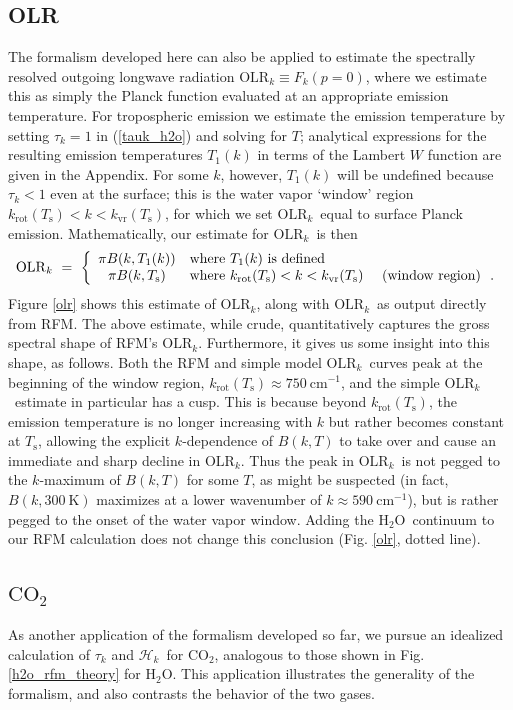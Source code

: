 \documentclass{ametsoc}
\newcommand{\beqn}{\begin{equation}}
\newcommand{\eeqn}{\end{equation}}
\newcommand{\eqnref}[1]{(\ref{#1})}
\newcommand{\Kelvin}{\ensuremath{\mathrm{K}}}
\newcommand{\cminverse}{\ensuremath{\mathrm{cm^{-1}}}}
\newcommand{\Ts}{\ensuremath{T_\mathrm{s}}}
\newcommand{\cotwo}{\ensuremath{\mathrm{CO_2}}}
\newcommand{\htwo}{\ensuremath{\mathrm{H_2O}}}
\newcommand{\OLRk}{\ensuremath{\mathrm{OLR}_k}}
\newcommand{\ch}{\ensuremath{\mathcal{H}}}
\newcommand{\chk}{\ensuremath{\ch_k}}
\newcommand{\tauk}{\ensuremath{\tau_k}}
\newcommand{\krot}{\ensuremath{k_\mathrm{rot}}}
\newcommand{\kvr}{\ensuremath{k_\mathrm{vr}}}
\begin{document}
\subsection{OLR} \label{sec_olrk}
The formalism developed here can also be applied to estimate the spectrally resolved outgoing longwave radiation $\OLRk \equiv F_k(p=0)$, where we estimate this as simply the Planck function evaluated at an appropriate emission temperature. For tropospheric emission we estimate the emission temperature by setting $\tauk=1$ in  \eqnref{tauk_h2o} and solving for $T$; analytical expressions for the resulting emission temperatures $T_1(k)$ in terms of the Lambert $W$ function are given in the Appendix. For some $k$, however,  $T_1(k)$ will be undefined because $\tauk<1$ even at the surface; this is the water vapor `window' region $\krot(\Ts) < k < \kvr(\Ts)$, for which we set \OLRk\ equal to surface Planck emission.  Mathematically, our estimate for  \OLRk\ is then 
\beqn
	\OLRk \ =  \ \left\{ \begin{array}{cl} \pi B(k,T_1(k)) & \mbox{where $T_1(k)$ is defined} \\
														\pi B(k,\Ts) & \mbox{where $\krot(\Ts) < k < \kvr(\Ts)$ \quad (window region) \ .} 
								\end{array}						
					   \right .
	\label{eqn_olrk}
\eeqn
Figure \ref{olr} shows this estimate of \OLRk, along with \OLRk\ as output directly from RFM. The above estimate, while crude, quantitatively captures the gross spectral shape of RFM's \OLRk. Furthermore, it gives us some insight into this shape, as follows. Both the RFM and simple model \OLRk\ curves peak at the beginning of the window region, $\krot(\Ts) \approx 750\ \cminverse$, and the simple  \OLRk\ estimate in particular has a cusp. This is because beyond $\krot(\Ts)$,   the emission temperature is no longer increasing with $k$ but rather becomes constant at \Ts,  allowing the explicit $k$-dependence of $B(k,T)$ to take over and cause an immediate and sharp decline in \OLRk. Thus the peak in \OLRk\ is not pegged to the $k$-maximum of $B(k,T)$ for some $T$, as might be suspected (in fact, $B(k,300\ \Kelvin)$ maximizes at a lower wavenumber of  $k\approx 590\ \cminverse$), but is rather pegged to the onset of the water vapor window. Adding the \htwo\ continuum to our RFM calculation does not change this conclusion (Fig. \ref{olr}, dotted line).


\subsection{\cotwo\ } \label{sec_co2}
As another application of the formalism developed so far, we pursue an idealized calculation of $\tauk$ and \chk\ for \cotwo, analogous to those shown in Fig. \ref{h2o_rfm_theory} for \htwo. This application illustrates the generality of the formalism, and also contrasts the behavior of the two gases.
\end{document}
